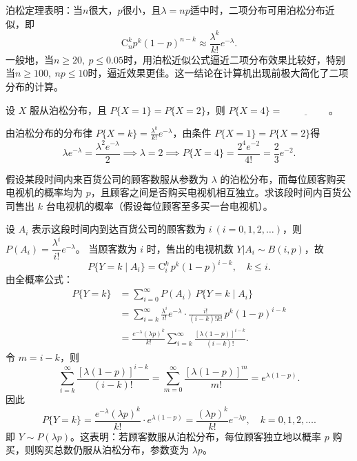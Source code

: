\documentclass[lang=cn,11pt]{elegantbook}
\begin{document}
\begin{note}
泊松定理表明：当$n$很大，$p$很小，且$\lambda = np$适中时，二项分布可用泊松分布近似，即
\[
\mathrm{C}_n^k p^k (1-p)^{n-k} \approx \frac{\lambda^k}{k!} e^{-\lambda}.
\]
一般地，当$n \ge 20,\ p \le 0.05$时，用泊松近似公式逼近二项分布效果比较好，特别当$n \ge 100,\ np \le 10$时，逼近效果更佳。这一结论在计算机出现前极大简化了二项分布的计算。
\end{note}

\begin{exercise}\label{exer:2-9}
设 $X$ 服从泊松分布，且 $P\{X=1\} = P\{X=2\}$，则 $P\{X=4\} = \underline{\hspace{2cm}}$。
\end{exercise}

\begin{solution}
由泊松分布的分布律 $P\{X = k\} = \frac{\lambda^k}{k!} e^{-\lambda}$，由条件 $P\{X=1\}=P\{X=2\}$得
\[
\lambda e^{-\lambda} = \frac{\lambda^2 e^{-\lambda}}{2} \implies \lambda = 2\implies
P\{X=4\} = \frac{2^4 e^{-2}}{4!} = \frac{2}{3} e^{-2}.
\]
\end{solution}

\begin{exercise}[泊松分布]\label{exer:2-27}
假设某段时间内来百货公司的顾客数服从参数为 $\lambda$ 的泊松分布，而每位顾客购买电视机的概率均为 $p$，且顾客之间是否购买电视机相互独立。求该段时间内百货公司售出 $k$ 台电视机的概率（假设每位顾客至多买一台电视机）。
\end{exercise}

\begin{solution}
设 $A_i$ 表示这段时间内到达百货公司的顾客数为 $i\ (i=0,1,2,\dots)$，则 $P(A_i) = \dfrac{\lambda^i}{i!}e^{-\lambda}$。
当顾客数为 $i$ 时，售出的电视机数 $Y|A_i \sim B(i,p)$，故
\[
P\{Y=k \mid A_i\} = \mathrm{C}_i^k\, p^k(1-p)^{i-k}, \quad k \le i.
\]
由全概率公式：
\begin{align*}
P\{Y=k\} &= \sum_{i=0}^{\infty} P(A_i)\,P\{Y=k \mid A_i\} \\
&= \sum_{i=k}^{\infty} \frac{\lambda^i}{i!}e^{-\lambda} \cdot \frac{i!}{(i-k)!k!}\, p^k(1-p)^{i-k} \\
&= \frac{e^{-\lambda}(\lambda p)^k}{k!} \sum_{i=k}^{\infty} \frac{[\lambda(1-p)]^{i-k}}{(i-k)!}.
\end{align*}
令 $m = i-k$，则
\[
\sum_{i=k}^{\infty} \frac{[\lambda(1-p)]^{i-k}}{(i-k)!} = \sum_{m=0}^{\infty} \frac{[\lambda(1-p)]^m}{m!} = e^{\lambda(1-p)}.
\]
因此
\[
P\{Y=k\} = \frac{e^{-\lambda}(\lambda p)^k}{k!} \cdot e^{\lambda(1-p)} = \frac{(\lambda p)^k}{k!} e^{-\lambda p}, \quad k=0,1,2,\dots.
\]
即 $Y \sim P(\lambda p)$。这表明：若顾客数服从泊松分布，每位顾客独立地以概率 $p$ 购买，则购买总数仍服从泊松分布，参数变为 $\lambda p$。
\end{solution}
\end{document}
